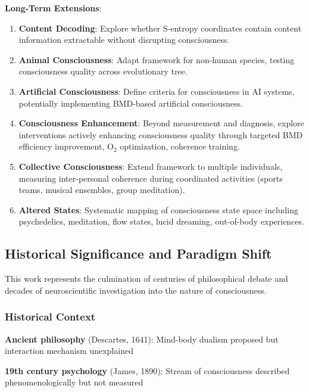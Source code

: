 \documentclass[11pt,onecolumn]{article}
\begin{document}
\textbf{Long-Term Extensions}:
\begin{enumerate}
\item \textbf{Content Decoding}: Explore whether S-entropy coordinates contain content information extractable without disrupting consciousness.

\item \textbf{Animal Consciousness}: Adapt framework for non-human species, testing consciousness quality across evolutionary tree.

\item \textbf{Artificial Consciousness}: Define criteria for consciousness in AI systems, potentially implementing BMD-based artificial consciousness.

\item \textbf{Consciousness Enhancement}: Beyond measurement and diagnosis, explore interventions actively enhancing consciousness quality through targeted BMD efficiency improvement, O$_2$ optimization, coherence training.

\item \textbf{Collective Consciousness}: Extend framework to multiple individuals, measuring inter-personal coherence during coordinated activities (sports teams, musical ensembles, group meditation).

\item \textbf{Altered States}: Systematic mapping of consciousness state space including psychedelics, meditation, flow states, lucid dreaming, out-of-body experiences.
\end{enumerate}

\subsection{Historical Significance and Paradigm Shift}

This work represents the culmination of centuries of philosophical debate and decades of neuroscientific investigation into the nature of consciousness.

\subsubsection{Historical Context}

\textbf{Ancient philosophy} (Descartes, 1641): Mind-body dualism proposed but interaction mechanism unexplained

\textbf{19th century psychology} (James, 1890): Stream of consciousness described phenomenologically but not measured
\end{document}
